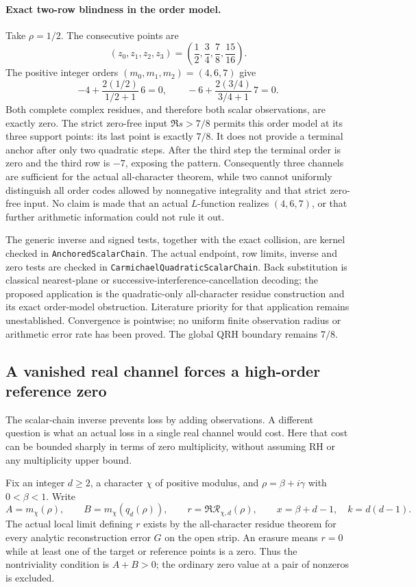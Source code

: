 \paragraph{Exact two-row blindness in the order model.}
Take \(\rho=1/2\). The consecutive points are
\[
 (z_0,z_1,z_2,z_3)=\left(\frac12,\frac34,\frac78,\frac{15}{16}\right).
\]
The positive integer orders \((m_0,m_1,m_2)=(4,6,7)\) give
\[
 -4+\frac{2(1/2)}{1/2+1}\,6=0,\qquad
 -6+\frac{2(3/4)}{3/4+1}\,7=0.
\]
Both complete complex residues, and therefore both scalar observations,
are exactly zero. The strict zero-free input \(\Re s>7/8\) permits this
order model at its three support points: its last point is exactly \(7/8\).
It does not provide a terminal anchor after only two quadratic steps.
After the third step the terminal order is zero and the third row is
\(-7\), exposing the pattern. Consequently three channels are sufficient
for the actual all-character theorem, while two cannot uniformly distinguish
all order codes allowed by nonnegative integrality and that strict
zero-free input. No claim is made that an actual \(L\)-function realizes
\((4,6,7)\), or that further arithmetic information could not rule it out.

The generic inverse and signed tests, together with the exact collision,
are kernel checked in \texttt{AnchoredScalarChain}. The actual endpoint,
row limits, inverse and zero tests are checked in
\texttt{CarmichaelQuadraticScalarChain}. Back substitution is classical
nearest-plane or successive-interference-cancellation decoding; the proposed
application is the quadratic-only all-character residue construction and
its exact order-model obstruction. Literature priority for that application
remains unestablished. Convergence is pointwise; no uniform finite observation
radius or arithmetic error rate has been proved. The global QRH boundary
remains \(7/8\).

\subsection{A vanished real channel forces a high-order reference zero}
\label{sec:scalar-erasure-cost}

The scalar-chain inverse prevents loss by adding observations. A different
question is what an actual loss in a single real channel would cost. Here
that cost can be bounded sharply in terms of zero multiplicity, without
assuming RH or any multiplicity upper bound.

Fix an integer \(d\ge2\), a character \(\chi\) of positive modulus, and
\(\rho=\beta+i\gamma\) with \(0<\beta<1\). Write
\[
 A=m_\chi(\rho),\qquad B=m_\chi(q_d(\rho)),\qquad
 r=\Re\mathcal R_{\chi,d}(\rho),\qquad
 x=\beta+d-1,\quad k=d(d-1).
\]
The actual local limit defining \(r\) exists by the all-character residue
theorem for every analytic reconstruction error \(G\) on the open strip.
An erasure means \(r=0\) while at least one of the target or reference
points is a zero. Thus the nontriviality condition is \(A+B>0\); the
ordinary zero value at a pair of nonzeros is excluded.

